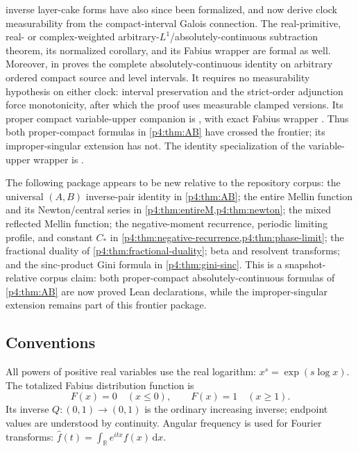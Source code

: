 \documentclass[11pt,oneside]{article}
\theoremstyle{definition}
\theoremstyle{remark}
\newcommand{\F}{F}
\newcommand{\Q}{Q}
\newcommand{\R}{\mathbb R}
\newcommand{\dd}{\,\mathrm d}
\newcommand{\1}{\mathbf 1}
\begin{document}
\begin{statusbox}
inverse layer-cake forms have also since been formalized, and now derive clock
measurability from the compact-interval Galois connection.  The real-primitive,
real- or complex-weighted arbitrary-\(L^1\)/absolutely-continuous subtraction theorem,
its normalized corollary, and its Fabius wrapper are formal as well.  Moreover,
 in
 proves the complete absolutely-continuous identity on
arbitrary ordered compact source and level intervals.  It requires no measurability
hypothesis on either clock: interval preservation and the strict-order adjunction force
monotonicity, after which the proof uses measurable clamped  versions.
Its proper compact variable-upper companion is
, with exact
Fabius wrapper
.
Thus both proper-compact formulas in \cref{p4:thm:AB} have crossed the frontier; its
improper-singular extension has not.  The identity specialization of the variable-upper
wrapper is
.
\end{statusbox}

\begin{resultbox}
The following package appears to be new relative to the repository corpus: the universal
\((A,B)\) inverse-pair identity in \cref{p4:thm:AB}; the entire Mellin function and its
Newton/central series in \cref{p4:thm:entireM,p4:thm:newton}; the mixed reflected Mellin
function; the negative-moment recurrence, periodic limiting profile, and constant
\(C_*\) in \cref{p4:thm:negative-recurrence,p4:thm:phase-limit}; the fractional duality of
\cref{p4:thm:fractional-duality}; beta and resolvent transforms; and the sinc-product
Gini formula in \cref{p4:thm:gini-sinc}.
This is a snapshot-relative corpus claim: both proper-compact absolutely-continuous formulas
of \cref{p4:thm:AB} are now proved Lean declarations, while the improper-singular
extension remains part of this frontier package.
\end{resultbox}

\subsection{Conventions}

All powers of positive real variables use the real logarithm:
\(x^s=\exp(s\log x)\).  The totalized Fabius distribution function is
\[
 \F(x)=0\quad(x\le0),\qquad \F(x)=1\quad(x\ge1).
\]
Its inverse \(\Q:(0,1)\to(0,1)\) is the ordinary increasing inverse; endpoint values
are understood by continuity.  Angular frequency is used for Fourier transforms:
\(\widehat f(t)=\int_\R e^{itx}f(x)\dd x\).
\end{document}
